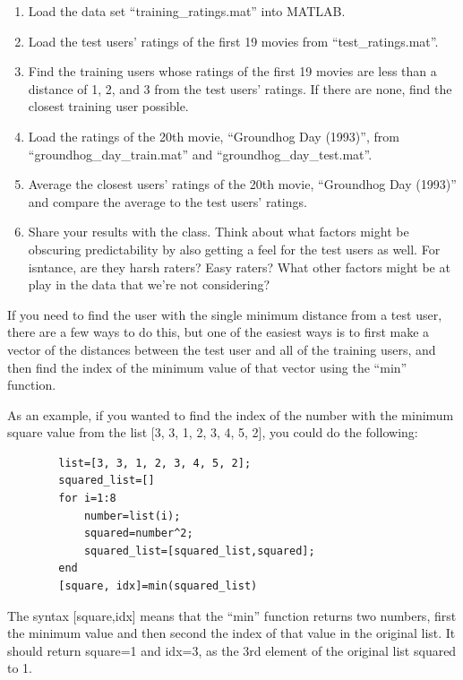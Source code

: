 \documentclass{ximera}
\begin{document}
    \begin{enumerate}

      \item Load the data set ``training\_ratings.mat'' into MATLAB.
      \item Load the test users' ratings of the first 19 movies from ``test\_ratings.mat''.
      \item Find the training users whose ratings of the first 19 movies are less than a distance of 1, 2, and 3 from the test users' ratings. If there are none, find the closest training user possible.
      \item Load the ratings of the 20th movie, ``Groundhog Day (1993)'', from ``groundhog\_day\_train.mat'' and ``groundhog\_day\_test.mat''.
      \item Average the closest users' ratings of the 20th movie, ``Groundhog Day (1993)'' and compare the average to the test users' ratings.
      \item Share your results with the class. Think about what factors might be obscuring predictability by also getting a feel for the test users as well. For isntance, are they harsh raters? Easy raters? What other factors might be at play in the data that we're not considering?
    \end{enumerate}

    \begin{hint}

      If you need to find the user with the single minimum distance from a test user, there are a few ways to do this, but one of the easiest ways is to first make a vector of the distances between the test user and all of the training users, and then find the index of the minimum value of that vector using the ``min'' function.

      As an example, if you wanted to find the index of the number with the minimum square value from the list [3, 3, 1, 2, 3, 4, 5, 2], you could do the following:
      \begin{verbatim}
        list=[3, 3, 1, 2, 3, 4, 5, 2];
        squared_list=[]
        for i=1:8
            number=list(i);
            squared=number^2;
            squared_list=[squared_list,squared];
        end
        [square, idx]=min(squared_list)
      \end{verbatim}

      The syntax [square,idx] means that the ``min'' function returns two numbers, first the minimum value and then second the index of that value in the original list. It should return square=1 and idx=3, as the 3rd element of the original list squared to 1.

    \end{hint}
\end{document}
